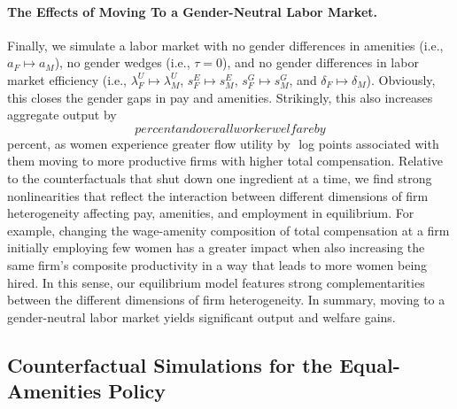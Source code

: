 \paragraph{The Effects of Moving To a Gender-Neutral Labor Market.}

Finally, we simulate a labor market with no gender differences in amenities (i.e., $a_{F} \mapsto a_{M}$), no gender wedges (i.e., $\tau = 0$), and no gender differences in labor market efficiency (i.e., $\lambda_{F}^{U} \mapsto \lambda_{M}^{U}$, $s_{F}^{E} \mapsto s_{M}^{E}$, $s_{F}^{G} \mapsto s_{M}^{G}$, and $\delta_{F} \mapsto \delta_{M}$). %
%
Obviously, this closes the gender gaps in pay and amenities. Strikingly, this also increases aggregate output by $$ percent and overall worker welfare by $$ percent, as women experience greater flow utility by $$ log points associated with them moving to more productive firms with higher total compensation. Relative to the counterfactuals that shut down one ingredient at a time, we find strong nonlinearities that reflect the interaction between different dimensions of firm heterogeneity affecting pay, amenities, and employment in equilibrium. For example, changing the wage-amenity composition of total compensation at a firm initially employing few women has a greater impact when also increasing the same firm's composite productivity in a way that leads to more women being hired. In this sense, our equilibrium model features strong complementarities between the different dimensions of firm heterogeneity. %
%
In summary, moving to a gender-neutral labor market yields significant output and welfare gains.


\clearpage
\subsection{Counterfactual Simulations for the Equal-Amenities Policy \label{app:equal_amenities_policy}}

